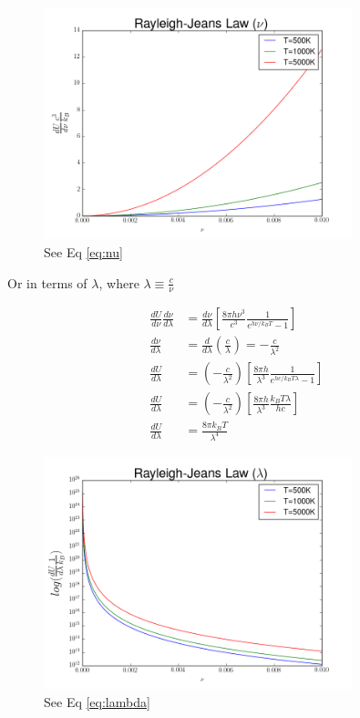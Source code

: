 \documentclass[12pt]{article}
\begin{document}
  \begin{figure}[h]
    \centering
    \includegraphics[width=0.8\textwidth]{Problem9a.png}
    \caption{See Eq \ref{eq:nu}}
  \end{figure}

  \clearpage

  Or in terms of $\lambda$, where $\lambda \equiv \frac{c}{\nu}$

  \begin{align}
    \frac{dU}{d\nu}\frac{d\nu}{d\lambda} &= \frac{d\nu}{d\lambda}\left[\frac{8\pi h \nu^3}{c^3 }\frac{1}{e^{h\nu/k_BT}-1}\right] \nonumber\\
    \frac{d\nu}{d\lambda} &= \frac{d}{d\lambda}\left(\frac{c}{\lambda}\right) = -\frac{c}{\lambda^2} \nonumber\\
    \frac{dU}{d\lambda} &= \left(-\frac{c}{\lambda^2}\right)\left[\frac{8\pi h}{\lambda^3}\frac{1}{e^{hc/k_BT\lambda}-1}\right] \nonumber\\
    \frac{dU}{d\lambda} &= \left(-\frac{c}{\lambda^2}\right)\left[\frac{8\pi h}{\lambda^3}\frac{k_BT\lambda}{hc}\right] \nonumber\\
    \label{eq:lambda}
    \frac{dU}{d\lambda} &= \frac{8\pi k_BT}{\lambda^4}
  \end{align}

  
  \begin{figure}[h]
    \centering
    \includegraphics[width=0.8\textwidth]{Problem9b.png}
    \caption{See Eq \ref{eq:lambda}}
  \end{figure}
\end{document}
